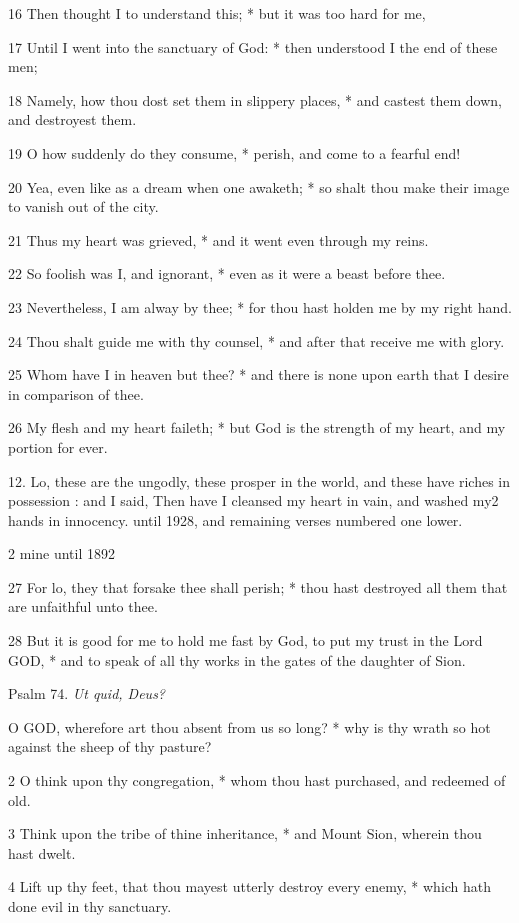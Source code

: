 16 Then thought I to understand this; * but it was too
hard for me,

17 Until I went into the sanctuary of God: * then understood
I the end of these men;

18 Namely, how thou dost set them in slippery places,
* and castest them down, and destroyest them.

19 O how suddenly do they consume, * perish, and come
to a fearful end!

20 Yea, even like as a dream when one awaketh; * so shalt
thou make their image to vanish out of the city.

21 Thus my heart was grieved, * and it went even through
my reins.

22 So foolish was I, and ignorant, * even as it were
a beast before thee.

23 Nevertheless, I am alway by thee; * for thou hast
holden me by my right hand.

24 Thou shalt guide me with thy counsel, * and after
that receive me with glory.

25 Whom have I in heaven but thee? * and there is none
upon earth that I desire in comparison of thee.

26 My flesh and my heart faileth; * but God is the strength
of my heart, and my portion for ever.

12. Lo, these are the ungodly,
these prosper in the world, and these have riches in possession : and I
said, Then have I cleansed my heart in vain, and washed my2 hands
in innocency.
until 1928, and remaining verses numbered one lower.

2 mine until
1892

27 For
lo, they that forsake thee shall perish; * thou hast destroyed all them
that are unfaithful unto thee.

28 But it is good for me to hold me fast by God, to
put my trust in the Lord GOD, * and to speak of all thy works in the gates
of the daughter of Sion.

Psalm
74. \emph{Ut quid, Deus?}

O
GOD, wherefore art thou absent from us so long? * why is thy wrath so
hot against the sheep of thy pasture?

2 O think upon thy congregation, * whom thou hast purchased,
and redeemed of old.

3 Think upon the tribe of thine inheritance, * and
Mount Sion, wherein thou hast dwelt.

4 Lift up thy feet, that thou mayest utterly destroy
every enemy, * which hath done evil in thy sanctuary.

